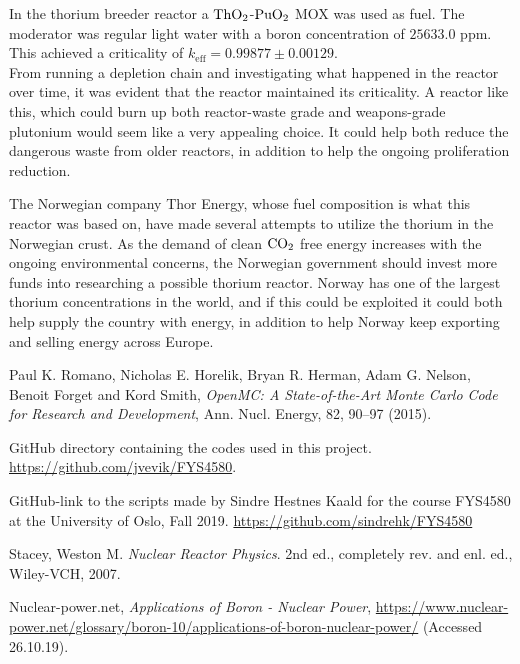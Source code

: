 \documentclass[norsk,a4paper,12pt]{article}
\begin{document}
\begin{multicols}{2}
In the thorium breeder reactor a $\ce{ThO_2}$-$\ce{PuO_2}$ MOX was used as fuel. The moderator was regular light water with a boron concentration of $25633.0$ ppm. This achieved a criticality of $k_{\text{eff}} = 0.99877 \pm 0.00129$. 
\\
From running a depletion chain and investigating what happened in the reactor over time, it was evident that the reactor maintained its criticality. A reactor like this, which could burn up both reactor-waste grade and weapons-grade plutonium would seem like a very appealing choice. It could help both reduce the dangerous waste from older reactors, in addition to help the ongoing proliferation reduction. 

The Norwegian company Thor Energy\cite{thorenergy}, whose fuel composition is what this reactor was based on, have made several attempts to utilize the thorium in the Norwegian crust. As the demand of clean $\ce{CO_2}$ free energy increases with the ongoing environmental concerns, the Norwegian government should invest more funds into researching a possible thorium reactor. Norway has one of the largest thorium concentrations in the world\cite{thorium2008}, and if this could be exploited it could both help supply the country with energy, in addition to help Norway keep exporting and selling energy across Europe. 




\begin{thebibliography}{999}

Paul K. Romano, Nicholas E. Horelik, Bryan R. Herman, Adam G. Nelson, Benoit Forget and Kord Smith, \textit{OpenMC: A State-of-the-Art Monte Carlo Code for Research and Development}, Ann. Nucl. Energy, 82, 90–97 (2015).

GitHub directory containing the codes used in this project. \href{https://github.com/jvevik/FYS4580}{https://github.com/jvevik/FYS4580}.


GitHub-link to the scripts made by Sindre Hestnes Kaald for the course FYS4580 at the University of Oslo, Fall 2019. \href{https://github.com/sindrehk/FYS4580}{https://github.com/sindrehk/FYS4580}


Stacey, Weston M. \textit{Nuclear Reactor Physics}. 2nd ed., completely rev. and enl. ed., Wiley-VCH, 2007.

Nuclear-power.net, \textit{Applications of Boron - Nuclear Power}, \href{https://www.nuclear-power.net/glossary/boron-10/applications-of-boron-nuclear-power/}{https://www.nuclear-power.net/glossary/boron-10/applications-of-boron-nuclear-power/} (Accessed 26.10.19).


\end{thebibliography}
\end{multicols}
\end{document}

